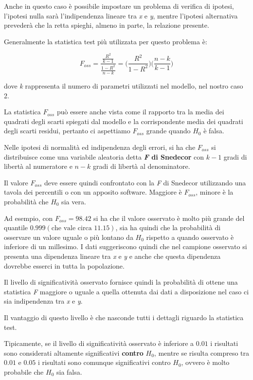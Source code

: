 Anche in questo caso è possibile impostare un problema di verifica di
ipotesi, l'ipotesi nulla sarà l'indipendenza lineare tra \emph{x} e
\emph{y}, mentre l'ipotesi alternativa prevederà che la retta spieghi,
almeno in parte, la relazione presente.

Generalmente la statistica test più utilizzata per questo problema è:

$$
F_{oss} = \frac{\frac{R^2}{k -1}}{\frac{1-R^2}{n-k}} = \Bigg( \frac{R^2}{1-R^2} \Bigg) \Bigg( \frac{n-k}{k-1}\Bigg)
$$

dove \textit{k} rappresenta il numero di parametri utilizzati nel modello, nel nostro caso 2.

La statistica $ F_{oss}  $ può essere anche vista come il rapporto tra la media dei quadrati degli scarti spiegati dal modello e la corrispondente media dei quadrati degli scarti residui, pertanto ci aspettiamo $ F_{oss}  $ grande quando $ H_0 $ è falsa.

Nelle ipotesi di normalità ed indipendenza degli errori, si ha che $ F_{oss} $ si distribuisce come una variabile aleatoria detta \textbf{\textit{F} di Snedecor} con $ k-1 $ gradi di libertà al numeratore e $ n-k $ gradi di libertà al denominatore.

Il valore $ F_{oss} $ deve essere quindi confrontato con la \textit{F} di Snedecor utilizzando una tavola dei percentili o con un apposito software. Maggiore è $ F_{oss} $, minore è la probabilità che $ H_0 $ sia vera.

Ad esempio, con $ F_{oss}  = 98.42 $ si ha che il valore osservato è molto più grande del quantile $ 0.999 (\text{che vale circa } 11.15)$, sia ha quindi che la probabilità di osservare un valore uguale o più lontano da $ H_0 $ rispetto a quando osservato è inferiore di un millesimo.
I dati suggeriscono quindi che nel campione osservato si presenta una dipendenza lineare tra \textit{x} e \textit{y} e anche che questa dipendenza dovrebbe esserci in tutta la popolazione.

Il livello di significatività osservato fornisce quindi la probabilità di ottene una statistica \textit{F} maggiore o uguale a quella ottenuta dai dati a disposizione nel caso ci sia indipendenza tra \textit{x} e \textit{y}.

Il vantaggio di questo livello è che nasconde tutti i dettagli riguardo la statistica test.

Tipicamente, se il livello di significatività osservato è inferiore a $ 0.01 $ i risultati sono considerati altamente significativi \textbf{contro} $ H_0 $, mentre se risulta compreso tra $ 0.01 $ e $ 0.05 $ i risultati sono comunque significativi contro $ H_0 $, ovvero è molto probabile che $ H_0 $ sia falsa.

